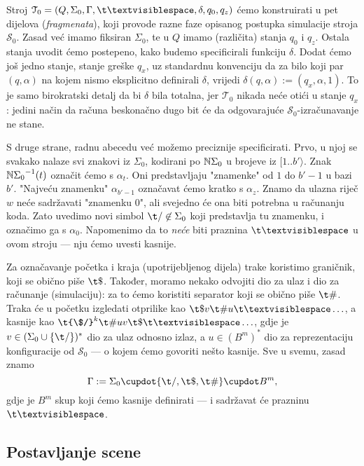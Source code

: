 Stroj $\mathcal T_0=(Q,\Sigma_0,\Gamma,\bl,\delta,q_0,q_z)$ ćemo konstruirati u pet dijelova (\emph{fragmenata}), koji provode razne faze opisanog postupka simulacije stroja $\mathcal S_0$. Zasad već imamo fiksiran $\Sigma_0$, te u $Q$ imamo (različita) stanja $q_0$ i $q_z$.
Ostala stanja uvodit ćemo postepeno, kako budemo specificirali funkciju $\delta$. Dodat ćemo još jedno stanje, stanje greške $q_x$, uz standardnu konvenciju da za bilo koji par $(q,\alpha)$ na kojem nismo eksplicitno definirali $\delta$, vrijedi $\delta(q,\alpha):=(q_x,\alpha,1)$. To je samo birokratski detalj da bi $\delta$ bila totalna, jer $\mathcal T_0$ nikada neće otići u stanje $q_x$: jedini način da računa beskonačno dugo bit će da odgovarajuće $\mathcal S_0$-izračunavanje ne stane.

S druge strane, radnu abecedu već možemo preciznije specificirati. Prvo, u njoj se svakako nalaze svi znakovi iz $\Sigma_0$, kodirani po ${\mathbb N}\Sigma_0$ u brojeve iz $[1..b'\rangle$. Znak ${{\mathbb N}\Sigma_0}^{-1}(t)$ označit ćemo s $\alpha_t$. Oni predstavljaju "znamenke" od $1$ do $b'-1$ u bazi $b'$. "Najveću znamenku" $\alpha_{b'-1}$ označavat ćemo kratko s $\alpha_z$. Znamo da ulazna riječ $w$ neće sadržavati "znamenku $0$", ali svejedno će ona biti potrebna u računanju koda. Zato uvedimo novi simbol $\t/\not\in\Sigma_0$ koji predstavlja tu znamenku, i označimo ga s $\alpha_0$. Napomenimo da to \emph{neće} biti praznina $\bl$ u ovom stroju --- nju ćemo uvesti kasnije.

Za označavanje početka i kraja (upotrijebljenog dijela) trake koristimo graničnik, koji se obično piše $\t\$$. Također, moramo nekako odvojiti dio za ulaz i dio za računanje (simulaciju): za to ćemo koristiti separator koji se obično piše $\t\#$. Traka će u početku izgledati otprilike kao $\t\$v\t\#u\bl\ldots$, a kasnije kao $\t{\$/}^k\t\#uv\t\$\bl\ldots$, gdje je $v\in(\Sigma_0\cup\{\t/\})^*$ dio za ulaz odnosno izlaz, a $u\in(B^m)^*$ dio za reprezentaciju konfiguracije od $\mathcal S_0$ --- o kojem ćemo govoriti nešto kasnije. Sve u svemu, zasad znamo
\begin{equation}
    \Gamma:=\Sigma_0\dcup\{\t/,\t\$,\t\#\}\dcup B^m\text,
\end{equation}
gdje je $B^m$ skup koji ćemo kasnije definirati --- i sadržavat će prazninu $\bl$.

\subsection{Postavljanje scene}

